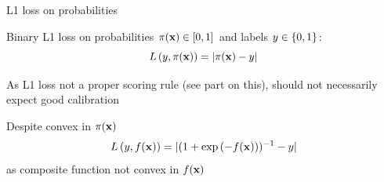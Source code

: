 \documentclass[11pt,compress,t,notes=noshow, xcolor=table]{beamer}
\begin{document}
\begin{vbframe}{L1 loss on probabilities}
\begin{itemizeM}
    \item Binary L1 loss on probabilities $\pi(\mathbf{x}) \in [0, 1]$ and labels $y \in \{0, 1\}$: $$L\left(y, \pi(\mathbf{x})\right) = |\pi(\mathbf{x}) - y|$$
    \item As L1 loss not a proper scoring rule (see part on this), should not necessarily expect good calibration
    \item Despite convex in $\pi(\mathbf{x})$ $$L\left(y, f(\mathbf{x})\right)=|(1+\exp{(-f(\mathbf{x}))})^{-1}-y|$$ as composite function not convex in $f(\mathbf{x})$ 
\end{itemizeM}

\lz


\end{vbframe}





\endlecture
\end{document}

